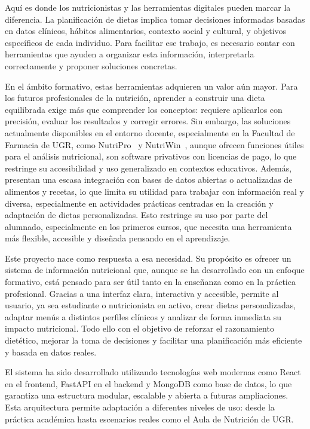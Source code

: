 Aquí es donde los nutricionistas y las herramientas digitales pueden marcar la diferencia. La planificación de dietas implica tomar decisiones informadas basadas en datos clínicos, hábitos alimentarios, contexto social y cultural, y objetivos específicos de cada individuo. Para facilitar ese trabajo, es necesario contar con herramientas que ayuden a organizar esta información, interpretarla correctamente y proponer soluciones concretas.

En el ámbito formativo, estas herramientas adquieren un valor aún mayor. Para los futuros profesionales de la nutrición, aprender a construir una dieta equilibrada exige más que comprender los conceptos: requiere aplicarlos con precisión, evaluar los resultados y corregir errores. Sin embargo, las soluciones actualmente disponibles en el entorno docente, especialmente en la Facultad de Farmacia de UGR, como NutriPro~\cite{NutriPro} y NutriWin~\cite{Nutriwin}, aunque ofrecen funciones útiles para el análisis nutricional, son software privativos con licencias de pago, lo que restringe su accesibilidad y uso generalizado en contextos educativos. Además, presentan una escasa integración con bases de datos abiertas o actualizadas de alimentos y recetas, lo que limita su utilidad para trabajar con información real y diversa, especialmente en actividades prácticas centradas en la creación y adaptación de dietas personalizadas. Esto restringe su uso por parte del alumnado, especialmente en los primeros cursos, que necesita una herramienta más flexible, accesible y diseñada pensando en el aprendizaje.

Este proyecto nace como respuesta a esa necesidad. Su propósito es ofrecer un sistema de información nutricional que, aunque se ha desarrollado con un enfoque formativo, está pensado para ser útil tanto en la enseñanza como en la práctica profesional. Gracias a una interfaz clara, interactiva y accesible, permite al usuario, ya sea estudiante o nutricionista en activo, crear dietas personalizadas, adaptar menús a distintos perfiles clínicos y analizar de forma inmediata su impacto nutricional. Todo ello con el objetivo de reforzar el razonamiento dietético, mejorar la toma de decisiones y facilitar una planificación más eficiente y basada en datos reales.

El sistema ha sido desarrollado utilizando tecnologías web modernas como React en el frontend, FastAPI en el backend y MongoDB como base de datos, lo que garantiza una estructura modular, escalable y abierta a futuras ampliaciones. Esta arquitectura permite adaptación a diferentes niveles de uso: desde la práctica académica hasta escenarios reales como el Aula de Nutrición de UGR.

